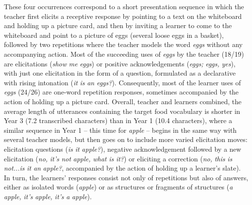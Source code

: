 \documentclass[output=paper,colorlinks,citecolor=brown,modfonts,nonflat]{../langscibook}
\begin{document}
\largerpage
These four occurrences correspond to a short presentation sequence in which the teacher first elicits a receptive response by pointing to a text on the whiteboard and holding up a picture card, and then by inviting a learner to come to the whiteboard and point to a picture of eggs (several loose eggs in a basket), followed by two repetitions where the teacher models the word \textit{eggs} without any accompanying action. Most of the succeeding uses of \textit{eggs} by the teacher (18/19) are elicitations (\textit{show} \textit{me} \textit{eggs}) or positive acknowledgements (\textit{eggs;} \textit{eggs,} \textit{yes}), with just one elicitation in the form of a question, formulated as a declarative with rising intonation (\textit{it} \textit{is} \textit{an} \textit{eggs?}). Consequently, most of the learner uses of \textit{eggs} (24/26) are one-word repetition responses, sometimes accompanied by the action of holding up a picture card. Overall, teacher and learners combined, the average length of utterances containing the target food vocabulary is shorter in Year 3 (7.2 transcribed characters) than in Year 1 (10.4 characters), where a similar sequence in Year 1 – this time for \textit{apple} – begins in the same way with several teacher models, but then goes on to include more varied elicitation moves: elicitation questions (\textit{is} \textit{it} \textit{apple?}), negative acknowledgement followed by a new elicitation (\textit{no,} \textit{it’s} \textit{not} \textit{apple,} \textit{what} \textit{is} \textit{it?}) or eliciting a correction (\textit{no,} \textit{this} \textit{is} \textit{not...is} \textit{it} \textit{an} \textit{apple?}, accompanied by the action of holding up a learner’s slate). In turn, the learners’ responses consist not only of repetitions but also of answers, either as isolated words (\textit{apple}) or as structures or fragments of structures (\textit{a} \textit{apple,} \textit{it’s} \textit{apple,} \textit{it’s} \textit{a} \textit{apple}).
\end{document}
